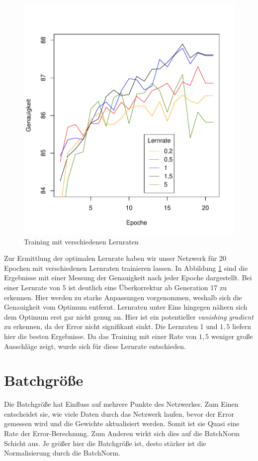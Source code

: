 \begin{figure}[H]
	\centering
	\includegraphics[scale=0.9]{./bilder/learningrate}
	\caption{Training mit verschiedenen Lernraten}
	\label{fig:learningrate}
\end{figure}

Zur Ermittlung der optimalen Lernrate haben wir unser Netzwerk für 20 Epochen mit verschiedenen Lernraten trainieren lassen. In Abbildung \ref{fig:learningrate} sind die Ergebnisse mit einer Messung der Genauigkeit nach jeder Epoche dargestellt. Bei einer Lernrate von 5 ist deutlich eine Überkorrektur ab Generation 17 zu erkennen. Hier werden zu starke Anpassungen vorgenommen, weshalb sich die Genauigkeit vom Optimum entfernt. Lernraten unter Eins hingegen nähern sich dem Optimum erst gar nicht genug an. Hier ist ein potentieller \textit{vanishing gradient} zu erkennen, da der Error nicht signifikant sinkt.  Die Lernraten 1 und $1,5$ liefern hier die besten Ergebnisse. Da das Training mit einer Rate von $1,5$ weniger große Ausschläge zeigt, wurde sich für diese Lernrate entschieden.
\section{Batchgröße}
Die Batchgröße hat Einfluss auf mehrere Punkte des Netzwerkes. Zum Einen entscheidet sie, wie viele Daten durch das Netzwerk laufen, bevor der Error gemessen wird und die Gewichte aktualisiert werden. Somit ist sie Quasi eine Rate der Error-Berechnung. Zum Anderen wirkt sich dies auf die BatchNorm Schicht aus. Je größer hier die Batchgröße ist, desto stärker ist die Normalisierung durch die BatchNorm.

